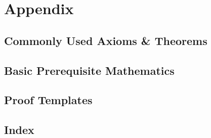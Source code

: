 \documentclass[11pt,fleqn,dvipsnames]{book} %
\begin{document}
\part*{Appendix}
\appendix
\chapter*{Commonly Used Axioms \& Theorems}

\renewcommand{\leftmark}{\sffamily\bfseries Axioms \& Theorems}
\renewcommand{\rightmark}{\sffamily\bfseries Axioms \& Theorems}



\chapter*{Basic Prerequisite Mathematics}


\chapter*{Proof Templates}



\chapter*{Index}
\renewcommand{\leftmark}{\sffamily\bfseries Index}
\renewcommand{\rightmark}{\sffamily\bfseries Index}
\setlength{\columnsep}{0.75cm} %

\printindex %

\end{document}
